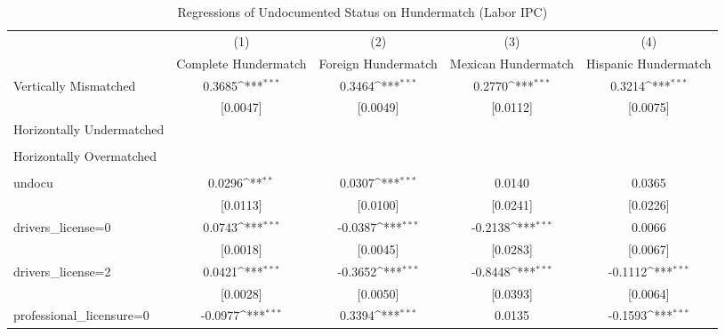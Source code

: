 \begin{table}[htbp]\centering
\def\sym#1{\ifmmode^{#1}\else\(^{#1}\)\fi}
\caption{Regressions of Undocumented Status on Hundermatch (Labor IPC)}
\begin{tabular}{l*{4}{c}}
\toprule
                    &\multicolumn{1}{c}{(1)}         &\multicolumn{1}{c}{(2)}         &\multicolumn{1}{c}{(3)}         &\multicolumn{1}{c}{(4)}         \\
                    &Complete Hundermatch         &Foreign Hundermatch         &Mexican Hundermatch         &Hispanic Hundermatch         \\
\midrule
Vertically Mismatched&      0.3685\sym{***}&      0.3464\sym{***}&      0.2770\sym{***}&      0.3214\sym{***}\\
                    &    [0.0047]         &    [0.0049]         &    [0.0112]         &    [0.0075]         \\
\addlinespace
Horizontally Undermatched&                     &                     &                     &                     \\
                    &                     &                     &                     &                     \\
\addlinespace
Horizontally Overmatched&                     &                     &                     &                     \\
                    &                     &                     &                     &                     \\
\addlinespace
undocu              &      0.0296\sym{**} &      0.0307\sym{***}&      0.0140         &      0.0365         \\
                    &    [0.0113]         &    [0.0100]         &    [0.0241]         &    [0.0226]         \\
\addlinespace
drivers\_license=0   &      0.0743\sym{***}&     -0.0387\sym{***}&     -0.2138\sym{***}&      0.0066         \\
                    &    [0.0018]         &    [0.0045]         &    [0.0283]         &    [0.0067]         \\
\addlinespace
drivers\_license=2   &      0.0421\sym{***}&     -0.3652\sym{***}&     -0.8448\sym{***}&     -0.1112\sym{***}\\
                    &    [0.0028]         &    [0.0050]         &    [0.0393]         &    [0.0064]         \\
\addlinespace
professional\_licensure=0&     -0.0977\sym{***}&      0.3394\sym{***}&      0.0135         &     -0.1593\sym{***}\\

\end{tabular}
\end{table}
